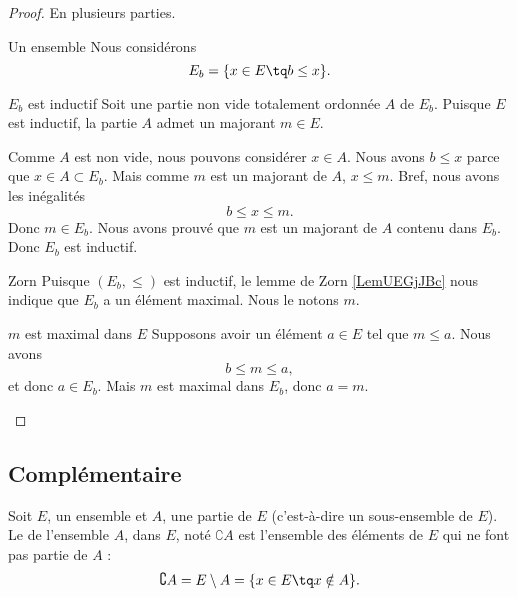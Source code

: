 \begin{proof}
	En plusieurs parties.
	\begin{subproof}
		\item[Un ensemble]
		Nous considérons
		\begin{equation}
			E_b=\{ x\in E\tq b\leq x \}.
		\end{equation}
		\item[\( E_b\) est inductif]
		Soit une partie non vide totalement ordonnée \( A\) de \( E_b\). Puisque \( E\) est inductif, la partie \( A\) admet un majorant \( m\in E\).

		Comme \( A\) est non vide, nous pouvons considérer \( x\in A\). Nous avons \( b\leq x\) parce que \( x\in A\subset E_b\). Mais comme \( m\) est un majorant de \( A\), \( x\leq m\). Bref, nous avons les inégalités
		\begin{equation}
			b\leq x\leq m.
		\end{equation}
		Donc \( m\in E_b\). Nous avons prouvé que \( m\) est un majorant de \( A\) contenu dans \( E_b\). Donc \( E_b\) est inductif.
		\item[Zorn]
		Puisque \( (E_b,\leq)\) est inductif, le lemme de Zorn \ref{LemUEGjJBc} nous indique que \( E_b\) a un élément maximal. Nous le notons \( m\).
		\item[\( m\) est maximal dans \( E\)]
		Supposons avoir un élément \( a\in E\) tel que \( m\leq a\). Nous avons
		\begin{equation}
			b\leq m\leq a,
		\end{equation}
		et donc \( a\in E_b\). Mais \( m\) est maximal dans \( E_b\), donc \( a=m\).
	\end{subproof}
\end{proof}


\subsection{Complémentaire}
\label{AppComplement}

\begin{definition}
	Soit \( E\), un ensemble et \( A\), une partie de \( E\) (c'est-à-dire un sous-ensemble de \( E\)). Le  de l'ensemble \(A \), dans \( E\), noté \( \complement A\) est l'ensemble des éléments de \( E\) qui ne font pas partie de \( A\) :
	\begin{equation}
		\complement A=E\setminus A=\{ x\in E\tq x\notin A \}.
	\end{equation}
\end{definition}

